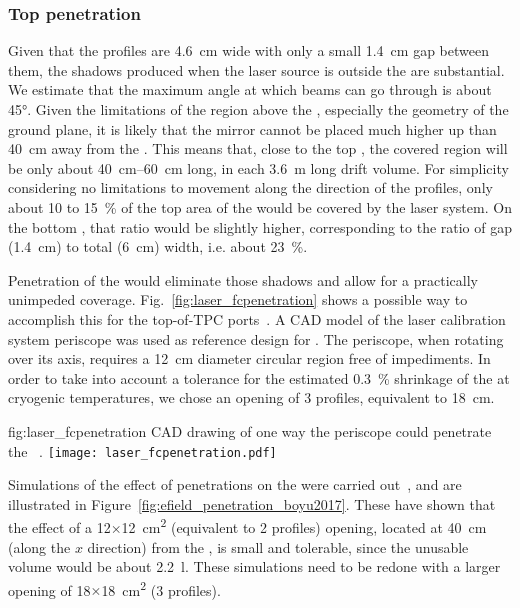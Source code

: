 \subsubsection{Top  penetration}
\label{sec:lasertopfcpen}

Given that the  profiles are \SI{4.6}{\cm} wide with only a small \SI{1.4}{\cm} gap between them, the shadows 
produced when the laser source is outside the  are substantial. We estimate that the maximum angle at which beams can go through is about \ang{45}. Given the limitations of the region above the , especially the geometry of the ground plane, it is likely that the mirror cannot be placed much higher up than \SI{40}{\cm} away from the . This means that, close to the top , the covered region will be only about \SIrange{40}{60}{\cm} long, in each \SI{3.6}{\m} long drift volume. 
For simplicity considering no limitations to movement along the direction of the  profiles, 
only about \num{10} to \SI{15}{\%} of the top area of the  would be covered by the laser system. On the bottom , that ratio would be slightly higher, corresponding to the ratio of gap (\SI{1.4}{\cm}) to total (\SI{6}{\cm}) width, i.e. about \SI{23}{\%}.

Penetration of the  would eliminate those shadows and allow for a practically unimpeded coverage. Fig.~\ref{fig:laser_fcpenetration} shows a possible way to accomplish this for the top-of-TPC ports~\cite{bib:yu2019a}. A CAD model of the  laser calibration system periscope was used as 
reference design for . The  periscope, when rotating over its axis, requires a \SI{12}{\cm} diameter circular region free of impediments. In order to take into account a tolerance for the estimated \SI{0.3}{\%} shrinkage of the  at cryogenic temperatures, we chose an opening of \num{3} profiles, equivalent to \SI{18}{\cm}.

\begin{dunefigure}{fig:laser_fcpenetration}
{CAD drawing of one way the periscope could penetrate the ~\cite{bib:yu2019a}.}
\texttt{[image: laser\_fcpenetration.pdf]}
\end{dunefigure}

Simulations of the effect of  penetrations on the \efield were carried out~\cite{bib:yu2017b}, and are illustrated in Figure~\ref{fig:efield_penetration_boyu2017}. These have shown that the effect of a \num{12}$\times$\SI{12}{\square\cm} (equivalent to \num{2} profiles) opening, located at \SI{40}{\cm} (along the $x$ direction) from the , is small and tolerable, since the unusable volume would be about \SI{2.2}{\litre}. These simulations need to be redone with a larger opening of \num{18}$\times$\SI{18}{\square\cm} (\num{3} profiles).

